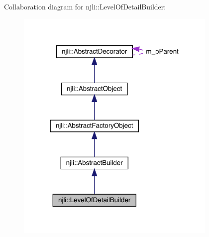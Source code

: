 Collaboration diagram for njli\+:\+:Level\+Of\+Detail\+Builder\+:\nopagebreak
\begin{figure}[H]
\begin{center}
\leavevmode
\includegraphics[width=273pt]{classnjli_1_1_level_of_detail_builder__coll__graph}
\end{center}
\end{figure}
